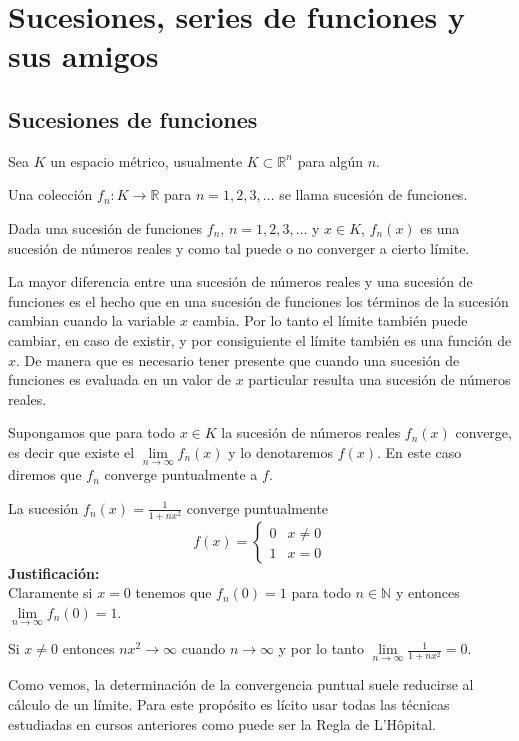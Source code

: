 \chapter{Sucesiones, series de funciones y sus amigos}


\section{Sucesiones de funciones}
Sea $K$ un espacio métrico, usualmente $K\subset \mathbb{R}^n$ para algún $n$. 

Una colección $f_n:K\to \mathbb{R}$ para $n=1,2,3,\dots$ se llama sucesión de funciones.

Dada una sucesión de funciones $f_n$, $n=1,2,3,\dots$  y $x\in K$, $f_n(x)$
es una sucesión de números reales y como tal puede o no converger a cierto límite.

La mayor diferencia entre una sucesión de números reales y una sucesión de funciones es
el hecho que en una sucesión de funciones los términos de la sucesión cambian cuando la variable
$x$ cambia. 
Por lo tanto el límite también puede cambiar, en caso de existir, y por consiguiente el límite
también es una función de $x$.
De manera que es necesario tener presente que cuando una sucesión de funciones es evaluada en
un valor de  $x$ particular resulta una sucesión de números reales.

Supongamos que para todo $x \in K$ la sucesión de números reales $f_n(x)$ converge,  
es decir que existe el $\lim\limits_{n \to \infty} f_n(x)$ y lo denotaremos $f(x)$. 
En este caso diremos que $f_n$ converge puntualmente a $f$.
 
\begin{ejemplo}
La sucesión $f_n(x)=\frac{1}{1+nx^2}$ converge puntualmente 
\[f(x)=\left\{\begin{array}{ll}
0&x\neq 0
\\
1&x=0
\end{array}
\right.\]
\textbf{Justificación:}
\\
Claramente si $x=0$ tenemos que $f_n(0)=1$ para todo $n \in \mathbb{N}$ y entonces $\lim\limits_{n \to \infty}f_n(0)=1$.

Si $x\neq 0$ entonces $nx^2\to \infty$ cuando $n\to \infty$  y por lo tanto $\lim\limits_{n \to \infty} \frac{1}{1+nx^2}=0$.

Como vemos, la determinación de la convergencia puntual suele reducirse al cálculo de un límite. 
Para este propósito es lícito usar todas las técnicas estudiadas en cursos anteriores como puede ser la Regla de L'H\^opital.
\end{ejemplo}

